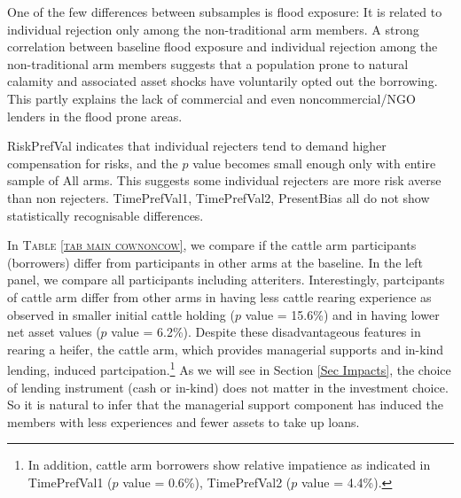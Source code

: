 	One of the few differences between subsamples is flood exposure: It is related to individual rejection only among the non-\textsf{traditional} arm members. %
	A strong correlation between baseline flood exposure and individual rejection among the non-\textsf{traditional} arm members suggests that a population prone to natural calamity and associated asset shocks have voluntarily opted out the borrowing. This partly explains the lack of commercial and even noncommercial/NGO lenders in the flood prone areas. 
	
	\textsf{RiskPrefVal} indicates that individual rejecters tend to demand higher compensation for risks, and the $p$ value becomes small enough only with entire sample of \textsf{All arms}. This suggests some individual rejecters are more risk averse than non rejecters. \textsf{TimePrefVal1, TimePrefVal2, PresentBias} all do not show statistically recognisable differences. 

	In \textsc{\small Table \ref{tab main cownoncow}}, we compare if the \textsf{cattle} arm participants (borrowers) differ from participants in other arms at the baseline. In the left panel, we compare all participants including atteriters. Interestingly, partcipants of \textsf{cattle} arm differ from other arms in having less cattle rearing experience as observed in smaller initial cattle holding ($p$ value = 15.6\%) and in having lower net asset values ($p$ value = 6.2\%). 
	Despite these disadvantageous features in rearing a heifer, the \textsf{cattle} arm, which provides managerial supports and in-kind lending, induced partcipation.\footnote{In addition, \textsf{cattle} arm borrowers show relative impatience as indicated in \textsf{TimePrefVal1} ($p$ value = 0.6\%), \textsf{TimePrefVal2} ($p$ value = 4.4\%). } As we will see in Section \ref{Sec Impacts}, the choice of lending instrument (cash or in-kind) does not matter in the investment choice. So it is natural to infer that the managerial support component has induced the members with less experiences and fewer assets to take up loans. 
	
